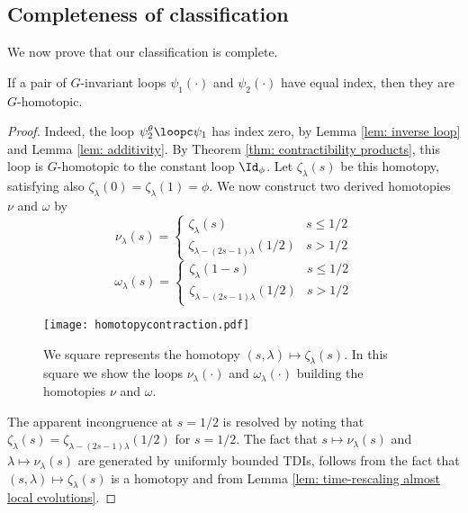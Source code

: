 \subsection{Completeness of classification}
We now prove that our classification is complete.
\begin{lemma}\label{lem: completeness products}
	If a pair of $G$-invariant loops $\psi_1(\cdot)$ and $\psi_2(\cdot)$ have equal index, then they are $G$-homotopic.  
\end{lemma}
\begin{proof}
	Indeed, the loop $\psi^\theta_2\loopc\psi_1$ has index zero, by Lemma \ref{lem: inverse loop} and Lemma \ref{lem: additivity}.  By Theorem \ref{thm: contractibility products}, this loop is $G$-homotopic to the constant loop $\Id_\phi$.  Let $\zeta_\lambda(s)$ be this homotopy, satisfying also $\zeta_\lambda(0)=\zeta_\lambda(1)=\phi$. 
	We now construct two derived homotopies $\nu$ and $\omega$ by 
	\begin{equation}\label{Homotopy Classification}
		\nu_\lambda(s)=\begin{cases} \zeta_\lambda(s)  &  s\leq 1/2 \\
			\zeta_{\lambda-(2s-1)\lambda}(1/2)   &  s > 1/2
		\end{cases}
	\end{equation}
	\begin{equation}
		\omega_\lambda(s)=\begin{cases} \zeta_\lambda(1-s)  &  s\leq 1/2 \\
			\zeta_{\lambda-(2s-1)\lambda}(1/2)   &  s > 1/2
		\end{cases}
	\end{equation}
	\begin{figure}[h] 
		\begin{center}
			\texttt{[image: homotopycontraction.pdf]}
			\caption{We square represents the homotopy $(s,\lambda)\mapsto \zeta_\lambda(s)$. In this square we show the loops $\nu_\lambda(\cdot)$ and $\omega_\lambda(\cdot)$ building the homotopies $\nu$ and $\omega$. }
			\label{fig: homotopycontraction}
		\end{center}
	\end{figure}
	The apparent incongruence at $s=1/2$ is resolved by noting that 
	$ \zeta_\lambda(s)=  \zeta_{\lambda-(2s-1)\lambda}(1/2)$ for $s=1/2$. 
	The fact that $s\mapsto \nu_\lambda(s) $ and $\lambda\mapsto \nu_\lambda(s)$ are generated by uniformly bounded TDIs, follows from the fact that $(s,\lambda)\mapsto \zeta_\lambda(s)$ is a homotopy and from Lemma \ref{lem: time-rescaling almost local evolutions}. 

\end{proof}
